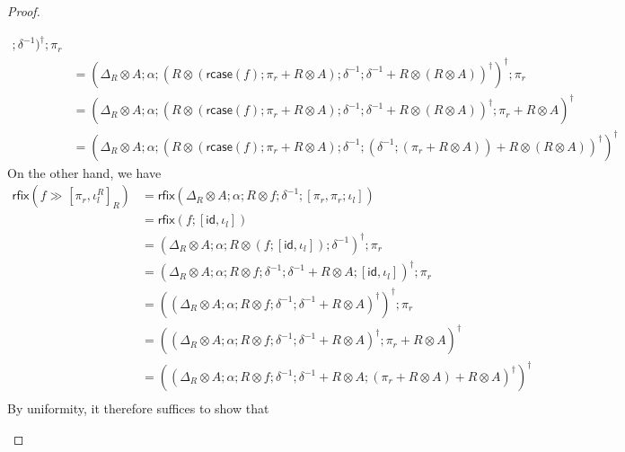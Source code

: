 \documentclass[acmsmall,screen,review]{acmart}
\newcommand{\ms}[1]{\ensuremath{\mathsf{#1}}}
\newcommand{\dmor}[1]{{\Delta}_{#1}}
\newcommand{\rcase}[1]{\ms{rcase}(#1)}
\newcommand{\rfix}[1]{\ms{rfix}(#1)}
\newcommand{\rseq}[3]{#2 \gg_{#1} #3}
\newcommand{\envcop}[3]{[#2, #3]_{#1}}
\newcommand{\envinl}[1]{\iota^{#1}_{l}}
\begin{document}
\begin{proof}
\begin{itemize}
\begin{equation}
\begin{aligned}
            ; \delta^{-1})^\dagger 
          ; \pi_r \\
        & = (\dmor{R} \otimes A ; \alpha 
            ; (
              R \otimes (\rcase{f} ; \pi_r + R \otimes A) ; \delta^{-1} 
                ; \delta^{-1} + R \otimes (R \otimes A))^\dagger
            )^\dagger 
          ; \pi_r \\
        & = (\dmor{R} \otimes A ; \alpha 
            ; (
              R \otimes (\rcase{f} ; \pi_r + R \otimes A) ; \delta^{-1} 
                ; \delta^{-1} + R \otimes (R \otimes A))^\dagger
              ; \pi_r + R \otimes A
            )^\dagger \\
        & = (\dmor{R} \otimes A ; \alpha 
            ; (
              R \otimes (\rcase{f} ; \pi_r + R \otimes A) ; \delta^{-1} 
                ; (\delta^{-1} ; (\pi_r + R \otimes A)) + R \otimes (R \otimes A)
              )^\dagger
            )^\dagger
      \end{aligned}
    \end{equation}
    On the other hand, we have
    \begin{equation}
      \begin{aligned}
        \rfix{\rseq{}{f}{\envcop{R}{\pi_r}{\envinl{R}}}}
        & = \rfix{
          \dmor{R} \otimes A ; \alpha ; R \otimes f ; \delta^{-1} ; [\pi_r, \pi_r ; \iota_l]
        } \\
        & = \rfix{f ; [\ms{id}, \iota_l]} \\
        & = (\dmor{R} \otimes A ; \alpha ; R \otimes (f ; [\ms{id}, \iota_l]) ; \delta^{-1})^\dagger 
          ; \pi_r \\
        & = (\dmor{R} \otimes A ; \alpha ; R \otimes f ; \delta^{-1}  
            ; \delta^{-1} + R \otimes A ; [\ms{id}, \iota_l])^\dagger 
          ; \pi_r \\
        & = ((\dmor{R} \otimes A ; \alpha ; R \otimes f ; \delta^{-1}  
        ; \delta^{-1} + R \otimes A)^\dagger)^\dagger ; \pi_r \\
        & = ((\dmor{R} \otimes A ; \alpha ; R \otimes f ; \delta^{-1}  
        ; \delta^{-1} + R \otimes A)^\dagger ; \pi_r + R \otimes A)^\dagger \\
        & = ((\dmor{R} \otimes A ; \alpha ; R \otimes f ; \delta^{-1}  
        ; \delta^{-1} + R \otimes A ; (\pi_r + R \otimes A) + R \otimes A)^\dagger)^\dagger \\
      \end{aligned}
    \end{equation}
    By uniformity, it therefore suffices to show that

\end{itemize}
\end{proof}
\end{document}
